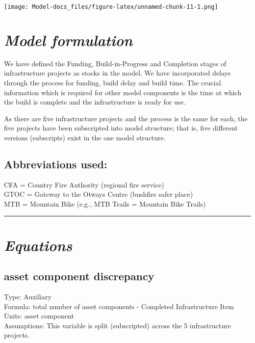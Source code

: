 \documentclass[
  11pt,
]{book}
\begin{document}
\texttt{[image: Model-docs\_files/figure-latex/unnamed-chunk-11-1.png]}

\hypertarget{model-formulation-6}{%
\section{\texorpdfstring{\emph{Model formulation}}{Model formulation}}\label{model-formulation-6}}

We have defined the Funding, Build-in-Progress and Completion stages of infrastructure projects as stocks in the model. We have incorporated delays through the process for funding, build delay and build time. The crucial information which is required for other model components is the time at which the build is complete and the infrastructure is ready for use.

As there are five infrastructure projects and the process is the same for each, the five projects have been subscripted into model structure; that is, five different versions (subscripts) exist in the one model structure.

\hypertarget{abbreviations-used}{%
\subsection{Abbreviations used:}\label{abbreviations-used}}

CFA = Country Fire Authority (regional fire service)\\
GTOC = Gateway to the Otways Centre (bushfire safer place)\\
MTB = Mountain Bike (e.g., MTB Trails = Mountain Bike Trails)

\begin{center}\rule{0.5\linewidth}{0.5pt}\end{center}

\hypertarget{equations-10}{%
\section{\texorpdfstring{\emph{Equations}}{Equations}}\label{equations-10}}

\hypertarget{asset-component-discrepancy}{%
\subsection{asset component discrepancy}\label{asset-component-discrepancy}}

Type: Auxiliary\\
Formula: total number of asset components - Completed Infrastructure Item\\
Units: asset component\\
Assumptions: This variable is split (subscripted) across the 5 infrastructure projects.
\end{document}
